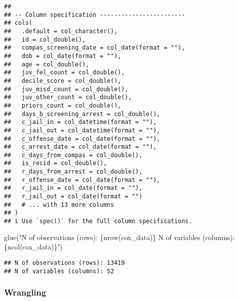 \documentclass[
]{book}
\newenvironment{Shaded}{\begin{snugshade}}{\end{snugshade}}
\newcommand{\FunctionTok}[1]{\textcolor[rgb]{0.00,0.00,0.00}{#1}}
\newcommand{\NormalTok}[1]{#1}
\newcommand{\StringTok}[1]{\textcolor[rgb]{0.31,0.60,0.02}{#1}}
\begin{document}
\begin{verbatim}
## 
## -- Column specification ------------------------
## cols(
##   .default = col_character(),
##   id = col_double(),
##   compas_screening_date = col_date(format = ""),
##   dob = col_date(format = ""),
##   age = col_double(),
##   juv_fel_count = col_double(),
##   decile_score = col_double(),
##   juv_misd_count = col_double(),
##   juv_other_count = col_double(),
##   priors_count = col_double(),
##   days_b_screening_arrest = col_double(),
##   c_jail_in = col_datetime(format = ""),
##   c_jail_out = col_datetime(format = ""),
##   c_offense_date = col_date(format = ""),
##   c_arrest_date = col_date(format = ""),
##   c_days_from_compas = col_double(),
##   is_recid = col_double(),
##   r_days_from_arrest = col_double(),
##   r_offense_date = col_date(format = ""),
##   r_jail_in = col_date(format = ""),
##   r_jail_out = col_date(format = "")
##   # ... with 13 more columns
## )
## i Use `spec()` for the full column specifications.
\end{verbatim}

\begin{Shaded}
\begin{Highlighting}[]
\FunctionTok{glue}\NormalTok{(}\StringTok{"N of observations (rows): \{nrow(cox\_data)\}}
\StringTok{      N of variables (columns): \{ncol(cox\_data)\}"}\NormalTok{)}
\end{Highlighting}
\end{Shaded}

\begin{verbatim}
## N of observations (rows): 13419
## N of variables (columns): 52
\end{verbatim}

\hypertarget{wrangling-2}{%
\subsubsection{Wrangling}\label{wrangling-2}}
\end{document}
